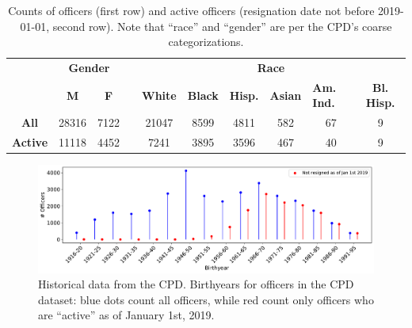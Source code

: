 \begin{table}[t!]
\caption{Counts of officers (first row) and active officers (resignation date not before 2019-01-01, second row). 
Note that ``race'' and ``gender'' are per the CPD's coarse categorizations.} \label{tab:stats}
\begin{tabular}{l|c|c|c|c|c|c|c|c|c|}
\cline{2-3} \cline{5-10}
                                               & \multicolumn{2}{c|}{\textbf{Gender}} & \multicolumn{1}{l|}{} & \multicolumn{6}{c|}{\textbf{Race}}                                                                                                                                                   \\ \cline{2-3} \cline{5-10} 
                                               & {\textbf{M}}   & {\textbf{F}}   &                       & {\textbf{White}} & {\textbf{Black}} & \multicolumn{1}{l|}{{\textbf{Hisp.}}} & {\textbf{Asian}} & \multicolumn{1}{l|}{{\textbf{Am. Ind.}}} & {\textbf{Bl. Hisp.}} \\ \cline{1-3} \cline{5-10} 
\multicolumn{1}{|c|}{\textbf{All}}    & 28316                 & 7122                  &                       & 21047                   & 8599                    & 4811                                         & 582                     & 67                                              & 9                           \\ \cline{1-3} \cline{5-10} 
\multicolumn{1}{|c|}{\textbf{Active}} & 11118                 & 4452                  &                       & 7241                    & 3895                    & 3596                                         & 467                     & 40                                              & 9                           \\ \cline{1-3} \cline{5-10} 
\end{tabular}
\end{table}

\begin{figure}[h] 
	\includegraphics[width=\textwidth]{figs/history_by} 
	\caption{Historical data from the CPD. Birthyears for officers in the CPD dataset: blue dots count all officers, while red count only officers who are ``active'' as of January 1st, 2019.} \label{fig:history_by}
\end{figure}

